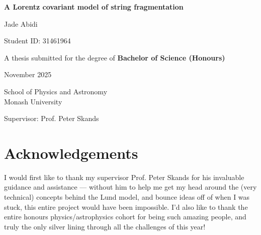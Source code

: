 \documentclass[12pt,a4paper]{report}
\begin{document}

\begin{titlepage}
  \centering
  \vspace*{2cm}
  {\LARGE\bfseries A Lorentz covariant model of string fragmentation \par}
  \vspace{1.5cm}
  \Large Jade Abidi \par
  \vspace{0.5cm}
  \large Student ID: 31461964 \par
  \vspace{0.5cm}
  {\large A thesis submitted for the degree of \bfseries{Bachelor of Science (Honours)}} \par
  \vspace{0.5cm}
  \large November 2025 \par
  \vspace{0.5cm}
  \vfill
  \large School of Physics and Astronomy \\ Monash University \par
  \vspace{0.5cm}
  \large Supervisor: Prof. Peter Skands \par
  \vfill
\end{titlepage}

\pagebreak

\begin{abstract}
Monte Carlo event generators are extensively used to simulate high-energy particle-collision events. For analytically intractable aspects, they rely on phenomenological models. The so-called Lund model describes the non-perturbative hadronisation process as the fragmentation of a classical string with constant tension. Lorentz covariance then implies self-similarity of this fragmentation process along the string. The current formulation of the Lund model, used in the PYTHIA generator, violates this property in terms of both kinematic distributions and hadronic chemistry. We introduce an additional tunable parameter that lessens this violation, and propose a new model for string fragmentation that manifestly preserves Lorentz covariance.
\end{abstract}

\pagebreak

\chapter*{Acknowledgements}
I would first like to thank my supervisor Prof. Peter Skands for his invaluable guidance and assistance --- without him to help me get my head around the (very technical) concepts behind the Lund model, and bounce ideas off of when I was stuck, this entire project would have been impossible. I'd also like to thank the entire honours physics/astrophysics cohort for being such amazing people, and truly the only silver lining through all the challenges of this year!
\end{document}
